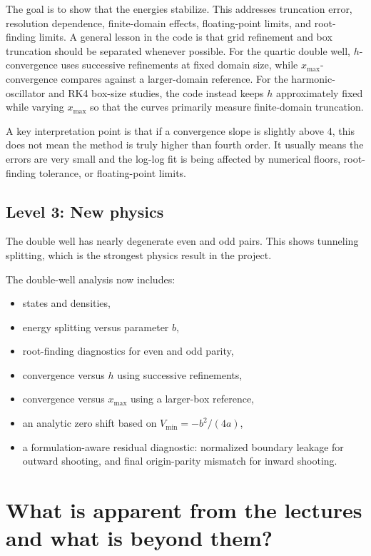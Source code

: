 \documentclass[11pt]{article}
\begin{document}
    The goal is to show that the energies stabilize. This addresses truncation error, resolution dependence, finite-domain effects, floating-point limits, and root-finding limits. A general lesson in the code is that grid refinement and box truncation should be separated whenever possible. For the quartic double well, $h$-convergence uses successive refinements at fixed domain size, while $x_{\max}$-convergence compares against a larger-domain reference. For the harmonic-oscillator and RK4 box-size studies, the code instead keeps $h$ approximately fixed while varying $x_{\max}$ so that the curves primarily measure finite-domain truncation.

    A key interpretation point is that if a convergence slope is slightly above 4, this does not mean the method is truly higher than fourth order. It usually means the errors are very small and the log-log fit is being affected by numerical floors, root-finding tolerance, or floating-point limits.

    \subsection{Level 3: New physics}

    The double well has nearly degenerate even and odd pairs. This shows tunneling splitting, which is the strongest physics result in the project.

    The double-well analysis now includes:
    \begin{itemize}
        \item states and densities,
        \item energy splitting versus parameter $b$,
        \item root-finding diagnostics for even and odd parity,
        \item convergence versus $h$ using successive refinements,
        \item convergence versus $x_{\max}$ using a larger-box reference,
        \item an analytic zero shift based on $V_{\min}=-b^2/(4a)$,
        \item a formulation-aware residual diagnostic: normalized boundary leakage for outward shooting, and final origin-parity mismatch for inward shooting.
    \end{itemize}

    \section{What is apparent from the lectures and what is beyond them?}
\end{document}
